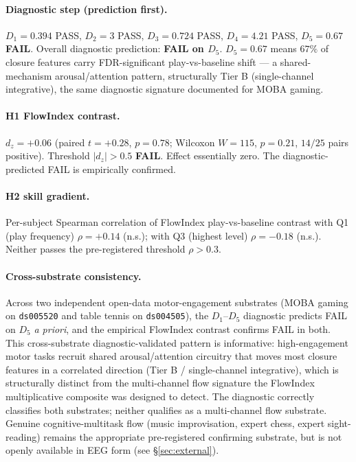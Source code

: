 \documentclass[11pt,a4paper]{article}
\begin{document}
\paragraph{Diagnostic step (prediction first).} $D_1 = 0.394$ PASS, $D_2 = 3$ PASS, $D_3 = 0.724$ PASS, $D_4 = 4.21$ PASS, $D_5 = 0.67$ \textbf{FAIL}. Overall diagnostic prediction: \textbf{FAIL on $D_5$}. $D_5 = 0.67$ means $67\%$ of closure features carry FDR-significant play-vs-baseline shift --- a shared-mechanism arousal/attention pattern, structurally Tier B (single-channel integrative), the same diagnostic signature documented for MOBA gaming.

\paragraph{H1 FlowIndex contrast.} $d_z = +0.06$ (paired $t = +0.28$, $p = 0.78$; Wilcoxon $W = 115$, $p = 0.21$, $14/25$ pairs positive). Threshold $|d_z| > 0.5$ \textbf{FAIL}. Effect essentially zero. The diagnostic-predicted FAIL is empirically confirmed.

\paragraph{H2 skill gradient.} Per-subject Spearman correlation of FlowIndex play-vs-baseline contrast with Q1 (play frequency) $\rho = +0.14$ (n.s.); with Q3 (highest level) $\rho = -0.18$ (n.s.). Neither passes the pre-registered threshold $\rho > 0.3$.

\paragraph{Cross-substrate consistency.} Across two independent open-data motor-engagement substrates (MOBA gaming on \texttt{ds005520} and table tennis on \texttt{ds004505}), the $D_1$--$D_5$ diagnostic predicts FAIL on $D_5$ \emph{a priori}, and the empirical FlowIndex contrast confirms FAIL in both. This cross-substrate diagnostic-validated pattern is informative: high-engagement motor tasks recruit shared arousal/attention circuitry that moves most closure features in a correlated direction (Tier B / single-channel integrative), which is structurally distinct from the multi-channel flow signature the FlowIndex multiplicative composite was designed to detect. The diagnostic correctly classifies both substrates; neither qualifies as a multi-channel flow substrate. Genuine cognitive-multitask flow (music improvisation, expert chess, expert sight-reading) remains the appropriate pre-registered confirming substrate, but is not openly available in EEG form (see \S\ref{sec:external}).
\end{document}
